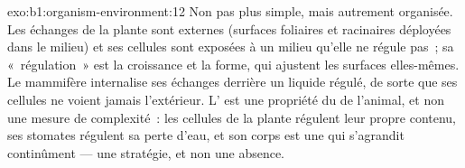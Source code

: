 \begin{solution}{exo:b1:organism-environment:12}
Non pas plus simple, mais autrement organisée. Les échanges de la plante
sont externes (surfaces foliaires et racinaires déployées dans le
milieu) et ses cellules sont exposées à un milieu qu'elle ne régule
pas~; sa «~régulation~» est la croissance et la forme, qui ajustent les
surfaces elles-mêmes. Le mammifère internalise ses échanges derrière un
liquide régulé, de sorte que ses cellules ne voient jamais l'extérieur.
L' est une propriété du  de l'animal, et non
une mesure de complexité~: les cellules de la plante régulent leur
propre contenu, ses stomates régulent sa perte d'eau, et son corps est
une  qui s'agrandit continûment --- une stratégie, et
non une absence.
\end{solution}

